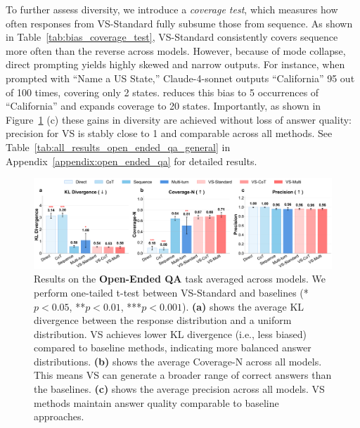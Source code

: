 To further assess diversity, we introduce a \textit{coverage test}, which measures how often responses from VS-Standard fully subsume those from sequence. As shown in Table~\ref{tab:bias_coverage_test}, VS-Standard consistently covers sequence more often than the reverse across models.
However, because of mode collapse, direct prompting yields highly skewed and narrow outputs. For instance, when prompted with ``Name a US State,'' Claude-4-sonnet outputs ``California'' 95 out of 100 times, covering only 2 states. \ours reduces this bias to 5 occurrences of ``California'' and expands coverage to 20 states.
Importantly, as shown in Figure~\ref{fig:open_ended_qa_combined_results} (c) these gains in diversity are achieved without loss of answer quality: precision for VS is stably close to 1 and comparable across all methods.
See Table~\ref{tab:all_results_open_ended_qa_general} in Appendix~\ref{appendix:open_ended_qa} for detailed results.




\begin{figure}[!htbp]
    \centering
    \includegraphics[width=\textwidth]{figures/bias/combined_kl_coverage_precision.pdf}
  \caption{
  Results on the \textbf{Open-Ended QA} task averaged across models. We perform one-tailed t-test between VS-Standard and baselines (*$p<0.05$, **$p<0.01$, ***$p<0.001$). 
      \textbf{(a)} shows the average KL divergence between the response distribution and a uniform distribution. VS achieves lower KL divergence (i.e., less biased) compared to baseline methods, indicating more balanced answer distributions. 
      \textbf{(b)} shows the average Coverage-N across all models. This means VS can generate a broader range of correct answers than the baselines. 
      \textbf{(c)}  shows the average precision across all models. VS methods maintain answer quality comparable to baseline approaches.
  }
  \label{fig:open_ended_qa_combined_results}
\end{figure}

